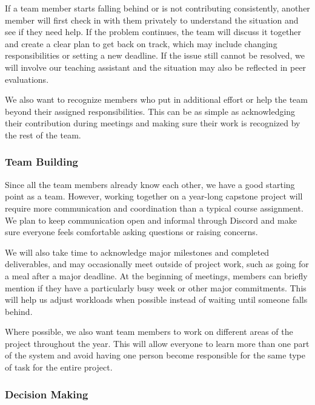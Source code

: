 \documentclass{article}
\begin{document}
\bigskip
If a team member starts falling behind or is not contributing consistently, another member will first check in with them privately to understand the situation and see if they need help. If the problem continues, the team will discuss it together and create a clear plan to get back on track, which may include changing responsibilities or setting a new deadline. If the issue still cannot be resolved, we will involve our teaching assistant and the situation may also be reflected in peer evaluations.

\bigskip
We also want to recognize members who put in additional effort or help the team beyond their assigned responsibilities. This can be as simple as acknowledging their contribution during meetings and making sure their work is recognized by the rest of the team.

\subsubsection*{Team Building}


Since all the team members already know each other, we have a good starting
point as a team. However, working together on a year-long capstone project will
require more communication and coordination than a typical course assignment. We
plan to keep communication open and informal through Discord and make sure
everyone feels comfortable asking questions or raising concerns.

\bigskip
We will also take time to acknowledge major milestones and completed
deliverables, and may occasionally meet outside of project work, such as going
for a meal after a major deadline. At the beginning of meetings, members can
briefly mention if they have a particularly busy week or other major
commitments. This will help us adjust workloads when possible instead of waiting
until someone falls behind.

\bigskip
Where possible, we also want team members to work on different areas of the
project throughout the year. This will allow everyone to learn more than one
part of the system and avoid having one person become responsible for the same
type of task for the entire project.

\subsubsection*{Decision Making} 
\end{document}
